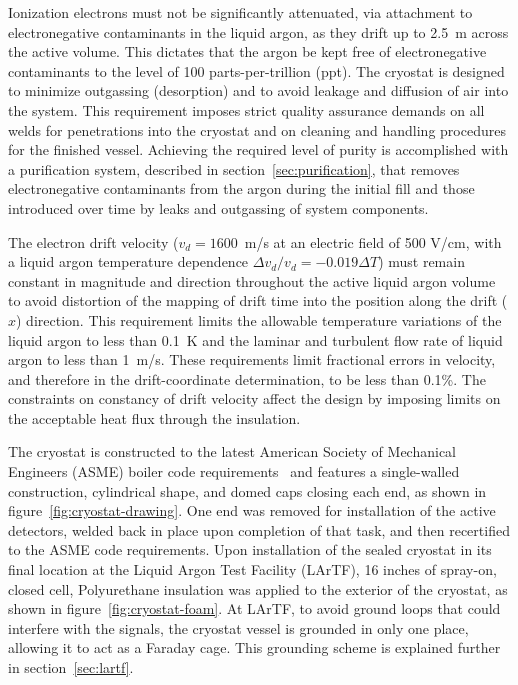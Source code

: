 Ionization electrons must not be significantly attenuated, via attachment to electronegative contaminants in the liquid argon, as they drift up to 2.5~m across the active volume. This dictates that the argon be kept free of electronegative contaminants to the level of 100 parts-per-trillion (ppt). The cryostat is designed to minimize outgassing (desorption) and to avoid leakage and diffusion of air into the system. This requirement imposes strict quality assurance demands on all welds for penetrations into the cryostat and on cleaning and handling procedures for the finished vessel.  Achieving the required level of purity is accomplished with a purification system, described in section~\ref{sec:purification}, that removes electronegative contaminants from the argon during the initial fill and those introduced over time by leaks and outgassing of system components.

The electron drift velocity ($v_{d} = 1600$~m/s at an electric field of 500 V/cm, with a liquid argon temperature dependence $\Delta v_{d}/v_{d} = -0.019\Delta T$) must remain constant in magnitude and direction throughout the active liquid argon volume to avoid distortion of the mapping of drift time into the position along the drift ($\hat{x}$) direction. This requirement limits the allowable temperature variations of the liquid argon to less than 0.1~K and the laminar and turbulent flow rate of liquid argon to less than 1~m/s. These requirements limit fractional errors in velocity, and therefore in the drift-coordinate determination, to be less than 0.1\%. The constraints on constancy of drift velocity affect the design by imposing limits on the acceptable heat flux through the insulation.

The cryostat is constructed to the latest American Society of Mechanical Engineers (ASME) boiler code requirements~\cite{pressure:1316452} and features a single-walled construction, cylindrical shape, and domed caps closing each end, as shown in figure~\ref{fig:cryostat-drawing}. One end was removed for installation of the active detectors, welded back in place upon completion of that task, and then recertified to the ASME code requirements.  Upon installation of the sealed cryostat in its final location at the Liquid Argon Test Facility (LArTF), 16 inches of spray-on, closed cell, Polyurethane insulation was applied to the exterior of the cryostat, as shown in figure~\ref{fig:cryostat-foam}.  At LArTF, to avoid ground loops that could interfere with the \lartpc signals, the cryostat vessel is grounded in only one place, allowing it to act as a Faraday cage.  This grounding scheme is explained further in section~\ref{sec:lartf}.

